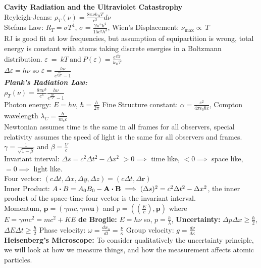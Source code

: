 \documentclass[10pt,landscape,a4paper]{article}
\newcommand{\subs}[1]{\ensuremath{_{\text{#1}}}}
\renewcommand{\^}[1]{\ensuremath{\hat{#1}}}
\begin{document}
	\begin{multicols}{4}
	\textbf{Cavity Radiation and the Ultraviolet Catastrophy}\\
	Reyleigh-Jeans: $ \rho_T(\nu) = \frac{8\pi\nu k_BT}{c^3}d\nu $\\
	Stefans Law: $ R_T = \sigma T^4 $, $ \sigma=\frac{2\pi^5k^4}{15c^2h^3} $, Wien's Displacement: $ \nu\subs{max}\propto~T $\\
	RJ is good fit at low frequencies, but assumption of equipartition is wrong, total energy is constant with atoms taking discrete energies in a Boltzmann distribution. $ \varepsilon ~ = ~ kT ~ \text{and}~P(\varepsilon) = \frac{e^{\frac{\varepsilon} {k_BT}}}{k_BT} $\\
	$ \Delta\varepsilon = h\nu $ so $ \bar{\varepsilon} = \frac{h\nu}{e^{\frac{h\nu}{k_BT}}-1} $\\
	\textbf{\textit{Plank's Radiation Law:}} \\
	$ \rho_T(\nu) = \frac{8\pi\nu^3}{c^3}\frac{h\nu}{e^{\frac{h\nu}{k_BT}}-1} $\\
	Photon energy: $ E = h\nu $, $ \hbar=\frac{h}{2\pi} $ Fine Structure constant: $ \alpha = \frac{e^2}{4\pi\epsilon_0\hbar c} $, Compton wavelength $ \lambda_C = \frac{h}{m_ec} $\\
	Newtonian assumes time is the same in all frames for all observers, special relativity assumes the speed of light is the same for all observers and frames.
	$ \gamma = \frac{1}{\sqrt{1-\beta}} $ and $ \beta=\frac{V}{c} $\\
	Invariant interval: $ \Delta s = c^2\Delta t^2 - \Delta x^2 $ $ >0 \implies $ time like, $ <0\implies $ space like, $ =0 \implies $ light like.\\
	Four vector: $ (c\Delta t,\Delta x,\Delta y,\Delta z)=( c\Delta t,\Delta \textbf{r}) $\\
	Inner Product: $ A\vdot B = A_0B_0 - \textbf{A}\vdot \textbf{B} \implies (\Delta s)^2 = c^2\Delta t^2 - \Delta x^2 $, the inner product of the space-time four vector is the invariant interval.\\
	Momentum, $ \textbf{p} = (\gamma mc, \gamma m\textbf{u}) $ and $ p = (\left(\frac{E}{c}\right),\textbf{p}) $ where $ E = \gamma mc^2 = mc^2 + KE $	
	\textbf{de Broglie:} $ E = h\nu $ so, $ p = \frac{h}{\lambda} $, \textbf{Uncertainty:} $ \Delta p \Delta x \geq \frac{\hbar}{2} $, $ \Delta E \Delta t \geq \frac{\hbar}{2} $ Phase velocity: $ \omega = \frac{dx_n}{dt}=\frac{\nu}{\kappa} $ Group velocity: $ g = \frac{d\nu}{d\kappa} $ \\
	\textbf{Heisenberg's Microscope:} To consider qualitatively the uncertainty principle, we will look at how we measure things, and how the measurement affects atomic particles.\\

\end{multicols}
\end{document}
